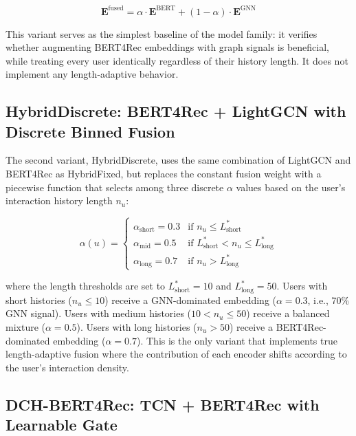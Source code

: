 \documentclass[12pt,a4paper]{report}
\begin{document}
\begin{equation}
    \mathbf{E}^{\text{fused}} = \alpha \cdot \mathbf{E}^{\text{BERT}}
    + (1 - \alpha) \cdot \mathbf{E}^{\text{GNN}}
    \label{eq:fusion_fixed}
\end{equation}

\noindent This variant serves as the simplest baseline of the model family:
it verifies whether augmenting BERT4Rec embeddings with graph signals is
beneficial, while treating every user identically regardless of their history
length. It does not implement any length-adaptive behavior.

\subsection{HybridDiscrete: BERT4Rec + LightGCN with Discrete Binned Fusion}

The second variant, HybridDiscrete, uses the same combination of LightGCN and
BERT4Rec as HybridFixed, but replaces the constant fusion weight with a
piecewise function that selects among three discrete \(\alpha\) values based on
the user's interaction history length \(n_u\):

\begin{equation}
    \alpha(u) = \begin{cases}
        \alpha_{\text{short}} = 0.3 & \text{if } n_u \leq L^*_{\text{short}} \\[4pt]
        \alpha_{\text{mid}}   = 0.5 & \text{if } L^*_{\text{short}} < n_u \leq L^*_{\text{long}} \\[4pt]
        \alpha_{\text{long}}  = 0.7 & \text{if } n_u > L^*_{\text{long}}
    \end{cases}
    \label{eq:fusion_discrete}
\end{equation}

\noindent where the length thresholds are set to \(L^*_{\text{short}} = 10\)
and \(L^*_{\text{long}} = 50\). Users with short histories (\(n_u \leq 10\))
receive a GNN-dominated embedding (\(\alpha = 0.3\), i.e., 70\% GNN signal).
Users with medium histories (\(10 < n_u \leq 50\)) receive a balanced mixture
(\(\alpha = 0.5\)). Users with long histories (\(n_u > 50\)) receive a
BERT4Rec-dominated embedding (\(\alpha = 0.7\)). This is the only variant that
implements true length-adaptive fusion where the contribution of each encoder
shifts according to the user's interaction density.

\subsection{DCH-BERT4Rec: TCN + BERT4Rec with Learnable Gate}
\end{document}
